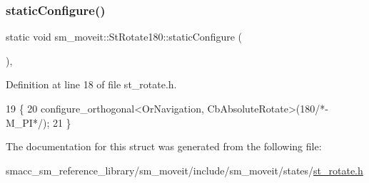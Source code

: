 \subsubsection{\texorpdfstring{static\+Configure()}{staticConfigure()}}
{\footnotesize\ttfamily static void sm\+\_\+moveit\+::\+St\+Rotate180\+::static\+Configure (\begin{DoxyParamCaption}{ }\end{DoxyParamCaption})\hspace{0.3cm}{\ttfamily [inline]}, {\ttfamily [static]}}



Definition at line 18 of file st\+\_\+rotate.\+h.


\begin{DoxyCode}
19     \{
20         configure\_orthogonal<OrNavigation, CbAbsoluteRotate>(180\textcolor{comment}{/*-M\_PI*/});
21     \}
\end{DoxyCode}


The documentation for this struct was generated from the following file\+:\begin{DoxyCompactItemize}
\item 
smacc\+\_\+sm\+\_\+reference\+\_\+library/sm\+\_\+moveit/include/sm\+\_\+moveit/states/\hyperlink{st__rotate_8h}{st\+\_\+rotate.\+h}\end{DoxyCompactItemize}
